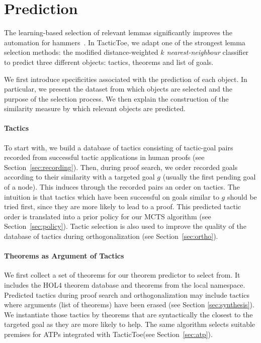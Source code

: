 \documentclass[runningheads,a4paper,draft]{svjour3}
\def\holfour{\textsf{HOL4}\xspace}
\def\tactictoe{\textsf{TacticToe}\xspace}
\begin{document}
\section{Prediction}\label{s:prediction}
The learning-based selection of relevant lemmas significantly improves the 
automation for hammers~\cite{BlanchetteGKKU16}. In \tactictoe, we adapt 
one of the strongest lemma selection 
methods: the modified distance-weighted \emph{$k$ nearest-neighbour} 
classifier~\cite{ckju-pxtp13,DudaniS76} to predict three different objects: 
 tactics, theorems and list of goals. 

We first introduce specificities associated with the prediction of each object. 
In particular, we present the dataset from which objects are selected and the 
purpose of the selection process. 
We then explain the construction of the similarity measure by which relevant 
objects are predicted.

\paragraph{Tactics}
To start with, we build a database of tactics consisting
of tactic-goal pairs recorded from successful tactic applications in human 
proofs (see 
Section~\ref{sec:recording}).
Then, during proof search, we order recorded goals according to their 
similarity with a targeted goal $g$ (usually the first pending goal of a node). 
This induces 
through the recorded pairs an 
order on tactics. The intuition is that tactics which have been successful on 
goals similar to $g$ should be tried first, since they are more likely to lead 
to a proof. 
This predicted tactic order is translated into a prior policy for our MCTS 
algorithm (see Section~\ref{sec:policy}).
Tactic selection is also used to improve the quality of the database 
of tactics during orthogonalization (see Section~\ref{sec:ortho}).

\paragraph{Theorems as Argument of Tactics}
We first collect a set of theorems for our theorem predictor to select from.
It includes the \holfour theorem database and theorems from the local namespace.
Predicted tactics during proof search and orthogonalization may include
tactics where arguments (list of theorems) have been erased (see Section 
\ref{sec:synthesis}).
We instantiate those tactics by theorems that are syntactically the closest to 
the targeted goal as they are more likely to help.
The same algorithm selects suitable premises for ATPs integrated with  
\tactictoe (see Section~\ref{sec:atp}).
\end{document}
